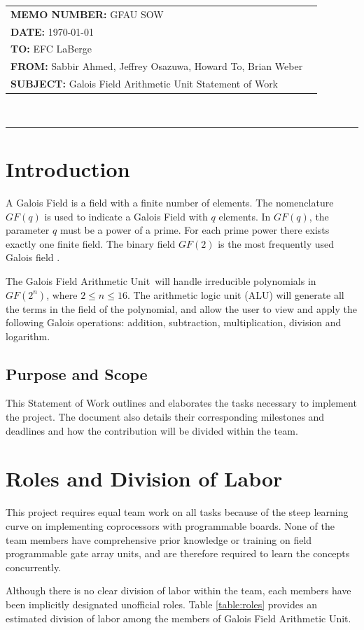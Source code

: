 \documentclass[12pt]{extarticle}
\newcommand{\team}{Galois Field Arithmetic Unit}
\newcommand{\Sabbir}{Sabbir Ahmed}
\newcommand{\Jeffrey}{Jeffrey Osazuwa}
\newcommand{\Howard}{Howard To}
\newcommand{\Brian}{Brian Weber}
\newcommand{\documentinfo}[5]{
    \begin{centering}
        \parbox{6.8in}{
        \begin{spacing}{1}
            \begin{flushleft}
                \begin{tabular}{l l} #1 \\ #2 \\ #3 \\ #4 \\ #5 \\
                \end{tabular}\\
                \rule{\textwidth}{1pt}
            \end{flushleft}
        \end{spacing} }
    \end{centering} }
\begin{document}
    \documentinfo {\textbf{MEMO NUMBER:} GFAU SOW} {\textbf{DATE:} {\today}}
    {\textbf{TO: } EFC LaBerge} {\textbf{FROM: }\Sabbir, \Jeffrey, \Howard,
    \Brian} {\textbf{SUBJECT: } Galois Field Arithmetic Unit Statement of Work}
    \vspace{-0.3in}

    \section{Introduction} A Galois Field is a field with a finite number of
    elements. The nomenclature $GF(q)$ is used to indicate a Galois Field with
    $q$ elements. In $GF(q)$, the parameter $q$ must be a power of a prime. For
    each prime power there exists exactly one finite field. The binary field
    $GF(2)$ is the most frequently used Galois field \cite{wolfdef}.

    The \team~will handle irreducible polynomials in $GF(2^n)$, where $2 \leq
    n \leq 16$. The arithmetic logic unit (ALU) will generate all the terms in
    the field of the polynomial, and allow the user to view and apply the
    following Galois operations: addition, subtraction, multiplication,
    division and logarithm.

        \subsection{Purpose and Scope} This Statement of Work outlines and
        elaborates the tasks necessary to implement the project. The document
        also details their corresponding milestones and deadlines and how the
        contribution will be divided within the team.

    \section{Roles and Division of Labor} This project requires equal team work
    on all tasks because of the steep learning curve on implementing
    coprocessors with programmable boards. None of the team members have
    comprehensive prior knowledge or training on field programmable gate array
    units, and are therefore required to learn the concepts concurrently.

    Although there is no clear division of labor within the team, each members
    have been implicitly designated unofficial roles. Table \ref{table:roles}
    provides an estimated division of labor among the members of \team.
\end{document}
